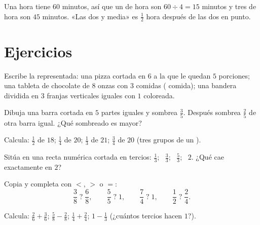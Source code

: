 \begin{example}\label{ex:g4:fractions:hour}
Una hora tiene $60$ minutos, así que un  de hora son
$60 \div 4 = 15$ minutos y tres  de hora son
$45$ minutos. «Las dos y media» es $\frac12$ hora después de las dos
en punto.
\end{example}

\section{Ejercicios}

\begin{exercise}[$\star$]\label{exo:g4:fractions:1}
Escribe la  representada: una pizza cortada en $6$ a la que le quedan $5$ porciones;
una tableta de chocolate de $8$ onzas con $3$ comidas ( comida); una
bandera dividida en $3$ franjas verticales iguales con $1$ coloreada.
\end{exercise}

\begin{exercise}[$\star$]\label{exo:g4:fractions:2}
Dibuja una barra cortada en $5$ partes iguales y sombrea $\frac35$. Después sombrea
$\frac{2}{5}$ de otra barra igual. ¿Qué sombreado es mayor?
\end{exercise}

\begin{exercise}[$\star$]\label{exo:g4:fractions:3}
Calcula: $\frac12$ de $18$; \quad $\frac14$ de $20$; \quad
$\frac13$ de $21$; \quad $\frac34$ de $20$ (tres grupos de un
).
\end{exercise}

\begin{exercise}[$\star$]\label{exo:g4:fractions:4}
Sitúa en una recta numérica cortada en tercios: $\frac13$; \ $\frac33$; \
$\frac53$; \ $2$. ¿Qué  cae exactamente en $2$?
\end{exercise}

\begin{exercise}[$\star$]\label{exo:g4:fractions:5}
Copia y completa con $<$, $>$ o $=$:
\[
\frac38 \;?\; \frac68, \qquad
\frac55 \;?\; 1, \qquad
\frac74 \;?\; 1, \qquad
\frac12 \;?\; \frac24 .
\]
\end{exercise}

\begin{exercise}[$\star$]\label{exo:g4:fractions:6}
Calcula: $\frac26 + \frac36$; \quad $\frac58 - \frac28$; \quad
$\frac14 + \frac24$; \quad $1 - \frac13$ (¿cuántos tercios hacen
$1$?).
\end{exercise}

